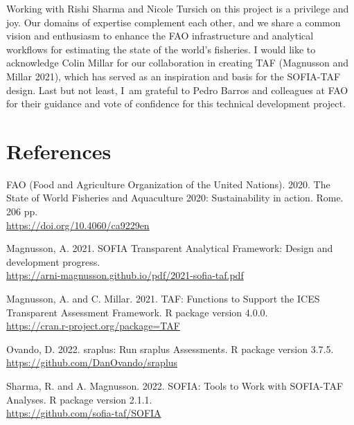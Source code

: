 \documentclass[12pt]{article}
\newcommand\blue[1]{\textcolor{darkblue}{#1}}
\begin{document}
Working with Rishi Sharma and Nicole Tursich on this project is a privilege and
joy. Our domains of expertise complement each other, and we share a common
vision and enthusiasm to enhance the FAO infrastructure and analytical workflows
for estimating the state of the world's fisheries. I would like to acknowledge
Colin Millar for our collaboration in creating TAF (Magnusson and Millar 2021),
which has served as an inspiration and basis for the SOFIA-TAF design. Last but
not least, I~am grateful to Pedro Barros and colleagues at FAO for their
guidance and vote of confidence for this technical development project.

\vspace{3ex}

\section{References}

\small\sloppy\setlength{}\selectfont
\begin{description}\setlength\itemsep{0.5ex}\vspace{0.5ex}

  \item FAO (Food and Agriculture Organization of the United Nations). 2020. The
  State of World Fisheries and Aquaculture 2020: Sustainability in action. Rome.
  206 pp.\\
  \blue{\footnotesize\url{https://doi.org/10.4060/ca9229en}}

  \item Magnusson, A. 2021. SOFIA Transparent Analytical Framework: Design and
  development progress.\\
  \blue{%
    \footnotesize\url{https://arni-magnusson.github.io/pdf/2021-sofia-taf.pdf}}

  \item Magnusson, A. and C. Millar. 2021. TAF: Functions to Support the ICES
  Transparent Assessment Framework. R package version 4.0.0.\\
  \blue{\footnotesize\url{https://cran.r-project.org/package=TAF}}

  \item Ovando, D. 2022. sraplus: Run sraplus Assessments. R package version
  3.7.5.\\
  \blue{\footnotesize\url{https://github.com/DanOvando/sraplus}}

  \item Sharma, R. and A. Magnusson. 2022. SOFIA: Tools to Work with SOFIA-TAF
  Analyses. R package version 2.1.1.\\
  \blue{\footnotesize\url{https://github.com/sofia-taf/SOFIA}}

\end{description}
\end{document}
